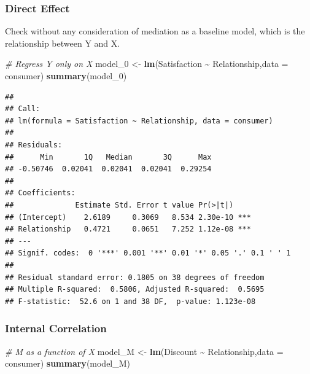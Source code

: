 \documentclass[
]{ctexart}
\newenvironment{Shaded}{\begin{snugshade}}{\end{snugshade}}
\newcommand{\AttributeTok}[1]{\textcolor[rgb]{0.13,0.29,0.53}{#1}}
\newcommand{\CommentTok}[1]{\textcolor[rgb]{0.56,0.35,0.01}{\textit{#1}}}
\newcommand{\FunctionTok}[1]{\textcolor[rgb]{0.13,0.29,0.53}{\textbf{#1}}}
\newcommand{\NormalTok}[1]{#1}
\newcommand{\OtherTok}[1]{\textcolor[rgb]{0.56,0.35,0.01}{#1}}
\newcommand{\SpecialCharTok}[1]{\textcolor[rgb]{0.81,0.36,0.00}{\textbf{#1}}}
\begin{document}
\hypertarget{direct-effect}{%
\subsubsection{Direct Effect}\label{direct-effect}}

Check without any consideration of mediation as a baseline model, which
is the relationship between Y and X.

\begin{Shaded}
\begin{Highlighting}[]
\CommentTok{\# Regress Y only on X}
\NormalTok{model\_0 }\OtherTok{\textless{}{-}} \FunctionTok{lm}\NormalTok{(Satisfaction }\SpecialCharTok{\textasciitilde{}}\NormalTok{ Relationship,}\AttributeTok{data =}\NormalTok{ consumer)}
\FunctionTok{summary}\NormalTok{(model\_0)}
\end{Highlighting}
\end{Shaded}

\begin{verbatim}
## 
## Call:
## lm(formula = Satisfaction ~ Relationship, data = consumer)
## 
## Residuals:
##      Min       1Q   Median       3Q      Max 
## -0.50746  0.02041  0.02041  0.02041  0.29254 
## 
## Coefficients:
##              Estimate Std. Error t value Pr(>|t|)    
## (Intercept)    2.6189     0.3069   8.534 2.30e-10 ***
## Relationship   0.4721     0.0651   7.252 1.12e-08 ***
## ---
## Signif. codes:  0 '***' 0.001 '**' 0.01 '*' 0.05 '.' 0.1 ' ' 1
## 
## Residual standard error: 0.1805 on 38 degrees of freedom
## Multiple R-squared:  0.5806, Adjusted R-squared:  0.5695 
## F-statistic:  52.6 on 1 and 38 DF,  p-value: 1.123e-08
\end{verbatim}

\hypertarget{internal-correlation}{%
\subsubsection{Internal Correlation}\label{internal-correlation}}

\begin{Shaded}
\begin{Highlighting}[]
\CommentTok{\# M as a function of X}
\NormalTok{model\_M }\OtherTok{\textless{}{-}} \FunctionTok{lm}\NormalTok{(Discount }\SpecialCharTok{\textasciitilde{}}\NormalTok{ Relationship,}\AttributeTok{data =}\NormalTok{ consumer)}
\FunctionTok{summary}\NormalTok{(model\_M)}
\end{Highlighting}
\end{Shaded}
\end{document}
